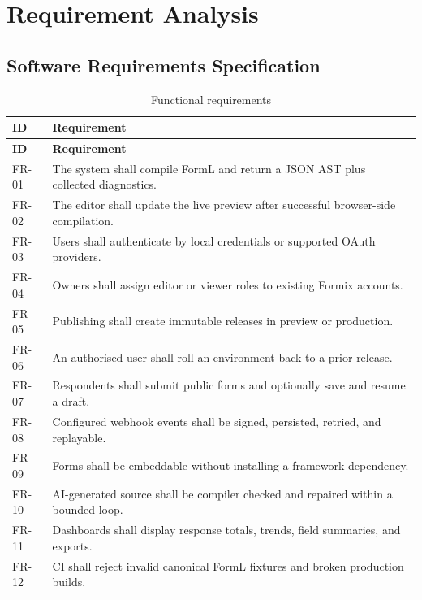 \documentclass[12pt,a4paper,oneside]{report}
\begin{document}
\section{Requirement Analysis}
\subsection{Software Requirements Specification}
\begin{longtable}{p{}p{}}
\caption{Functional requirements}\label{tab:functional}\\
\toprule
\textbf{ID} & \textbf{Requirement}\\
\midrule
\endfirsthead
\toprule
\textbf{ID} & \textbf{Requirement}\\
\midrule
\endhead
FR-01 & The system shall compile FormL and return a JSON AST plus collected diagnostics.\\
FR-02 & The editor shall update the live preview after successful browser-side compilation.\\
FR-03 & Users shall authenticate by local credentials or supported OAuth providers.\\
FR-04 & Owners shall assign editor or viewer roles to existing Formix accounts.\\
FR-05 & Publishing shall create immutable releases in preview or production.\\
FR-06 & An authorised user shall roll an environment back to a prior release.\\
FR-07 & Respondents shall submit public forms and optionally save and resume a draft.\\
FR-08 & Configured webhook events shall be signed, persisted, retried, and replayable.\\
FR-09 & Forms shall be embeddable without installing a framework dependency.\\
FR-10 & AI-generated source shall be compiler checked and repaired within a bounded loop.\\
FR-11 & Dashboards shall display response totals, trends, field summaries, and exports.\\
FR-12 & CI shall reject invalid canonical FormL fixtures and broken production builds.\\
\bottomrule
\end{longtable}
\end{document}
